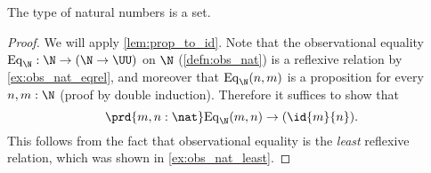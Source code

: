 \begin{thm}\label{thm:eq_nat}
The type of natural numbers is a set.
\end{thm}

\begin{proof}
We will apply \cref{lem:prop_to_id}. Note that the observational equality $\mathrm{Eq}_\N:\N\to(\N\to\UU)$ on $\N$ (\cref{defn:obs_nat}) is a reflexive relation by \autoref{ex:obs_nat_eqrel}, and moreover that $\mathrm{Eq}_\N(n,m)$ is a proposition for every $n,m:\N$ (proof by double induction).
Therefore it suffices to show that
\begin{equation*}
\prd{m,n:\nat}\mathrm{Eq}_\N(m,n)\to (\id{m}{n}).
\end{equation*}
This follows from the fact that observational equality is the \emph{least} reflexive relation, which was shown in \cref{ex:obs_nat_least}.
\end{proof}

\begin{comment}
\begin{thm}[Hedberg]\label{thm:dec_eq}
Any type with decidable equality is a set.
\end{thm}

\begin{proof}
Let $A$ be a type, and let $d:\prd{x,y:A}(\id{x}{y})+\neg(\id{x}{y})$ be the witness that $A$ has decidable equality.
We first construct a reflexive binary relation $E:A\to A\to\type$ such that each $E(x,y)$ is a proposition.
For every $x,y:A$, we first define a type family $E'(x,y):((\id{x}{y})+\neg(\id{x}{y}))\to\type$ by
\begin{align*}
E'(x,y,\inl(p)) & \defeq \unit \\
E'(x,y,\inr(p)) & \defeq \emptyt.
\end{align*}
Note that $E'(x,y,q)$ is a proposition for each $x,y:A$ and $q:(\id{x}{y})+\neg(\id{x}{y})$. 
Now we set $E(x,y)\defeq E'(x,y,d(x,y))$. Then $E$ is clearly reflexive, and a family of propositions.
Therefore it remains to show that $E$ implies identity. 

Since $E$ is defined as an instance of $E'$, it suffices to construct a term of type
\begin{equation*}
\prd{x,y:A}{q:(\id{x}{y})+\neg(\id{x}{y})} E'(q)\to (\id{x}{y}). 
\end{equation*}
By induction of disjoint sums, it suffices to construct terms of types
\begin{align*}
& \prd{x,y:A}{p:\id{x}{y}} \unit\to (\id{x}{y}) \\
& \prd{x,y:A}{p:\neg(\id{x}{y})} \emptyt\to (\id{x}{y}).
\end{align*}
In the first case, we take $\lam{x}{y}{p}{t}p$, and the second case is by induction on the empty type.
\end{proof}
\end{comment}

